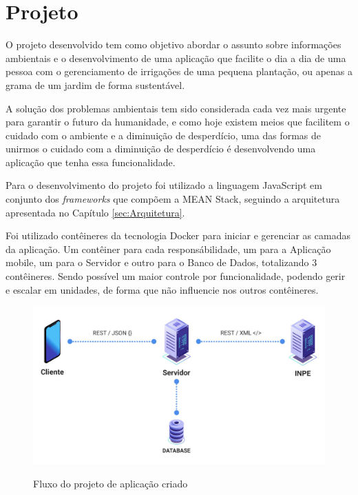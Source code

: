 \documentclass[
	12pt,				%
	openright,			%
	twoside,			%
	a4paper,			%
	english,			%
	brazil				%
	]{abntex2}
\begin{document}
\chapter{Projeto}

O projeto desenvolvido tem como objetivo abordar o assunto sobre informações ambientais e o desenvolvimento de uma aplicação que facilite o dia a dia de uma pessoa com o gerenciamento de irrigações de uma pequena plantação, ou apenas a grama de um jardim de forma sustentável.

A solução dos problemas ambientais tem sido considerada cada vez mais urgente para garantir o futuro da humanidade, e como hoje existem meios que facilitem o cuidado com o ambiente e a diminuição de desperdício, uma das formas de unirmos o cuidado com a diminuição de desperdício é desenvolvendo uma aplicação que tenha essa funcionalidade.

Para o desenvolvimento do projeto foi utilizado a linguagem JavaScript em conjunto dos \textit{frameworks} que compõem a MEAN Stack, seguindo a arquitetura apresentada no Capítulo \ref{sec:Arquitetura}.

Foi utilizado contêineres da tecnologia Docker para iniciar e gerenciar as camadas da aplicação. Um contêiner para cada responsábilidade, um para a Aplicação mobile, um para o Servidor e outro para o Banco de Dados, totalizando 3 contêineres. Sendo possível um maior controle por funcionalidade, podendo gerir e escalar em unidades, de forma que não influencie nos outros contêineres.

\begin{figure}[h]
	\centering

	\caption{Fluxo do projeto de aplicação criado} \label{fig:ProjectFlow}
    \includegraphics[scale=0.35]{project-flow} \\

\end{figure}
\end{document}
